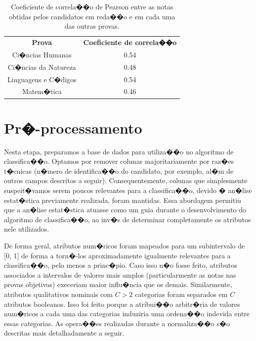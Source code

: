 \documentclass[12pt]{article}
\begin{document}
\begin{table}[H]
\centering\begin{tabular}{ c c }
  \textbf{Prova}       & \textbf{Coeficiente de correla��o} \\
  Ci�ncias Humanas     & 0.54 \\
  Ci�ncias da Natureza & 0.48 \\
  Linguagens e C�digos & 0.54 \\
  Matem�tica           & 0.46 \\
\end{tabular}
\caption{Coeficiente de correla��o de Pearson entre as notas obtidas pelos candidatos em reda��o e em cada uma das outras provas.}
\label{tab:coeficiente-pearson-por-prova}
\end{table}

\section{Pr�-processamento}
Nesta etapa, preparamos a base de dados para utiliza��o no algoritmo de classifica��o.
Optamos por remover colunas majoritariamente por raz�es t�cnicas (n�mero de identifica��o do candidato, por exemplo, al�m de outros campos descritos a seguir). Consequentemente, colunas que simplesmente suspeit�vamos serem poucos relevantes para a classifica��o, devido � an�lise estat�stica previamente realizada, foram mantidas.
Essa abordagem permitiu que a an�lise estat�stica atuasse como um guia durante o desenvolvimento do algoritmo de classifica��o, ao inv�s de determinar completamente os atributos nele utilizados.

De forma geral, atributos num�ricos foram mapeados para um subintervalo de [0, 1] de forma a torn�-los aproximadamente igualmente relevantes para a classifica��o, pelo menos a princ�pio.
Caso isso n�o fosse feito, atributos associados a intervalos de valores mais amplos (particularmente as notas nas provas objetivas) execeriam maior influ�ncia que os demais.
Similarmente, atributos qualitativos nominais com $C > 2$ categorias foram separados em $C$ atributos booleanos.
Isso foi feito porque a atribui��o arbitr�ria de valores num�ricos a cada uma das categorias induziria uma ordena��o indevida entre essas categorias.
As opera��es realizadas durante a normaliza��o s�o descritas mais detalhadamente a seguir.
\end{document}
